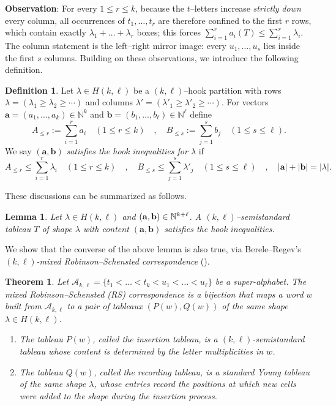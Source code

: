 \documentclass[12pt,a4paper,oneside]{amsart}
\newtheorem{theorem}{Theorem}[section]
\newtheorem{lemma}{Lemma}[section]
\theoremstyle{definition}
\newtheorem{definition}{Definition}[section]
\newcommand{\N}{\mathbb{N}}
\begin{document}
\textbf{Observation}: For every $1\le r\le k$, because the $t$–letters increase \emph{strictly} \textit{down} every column, all occurrences of $t_1,\dots ,t_r$ are therefore confined to the first $r$ rows, which contain exactly $\lambda_1+\dots +\lambda_r$ boxes; this forces $\sum_{i=1}^r a_i(T)\le \sum_{i=1}^{r}\lambda_i$. The column statement is the left–right mirror image: every $u_1,\dots ,u_s$ lies inside the first $s$ columns. Building on these observations, we introduce the following definition.

\begin{definition}
Let $\lambda\in H(k,\ell)$ be a $(k,\ell)$–hook partition with rows $\lambda=(\lambda_1\ge\lambda_2\ge\cdots)$ and columns $\lambda'=(\lambda'_1\ge\lambda'_2\ge\cdots)$.
For vectors $\mathbf a=(a_1,\dots ,a_k)\in\N^{k}$
and $\mathbf b=(b_1,\dots ,b_\ell)\in\N^{\ell}$ define
\[
  A_{\le r}:=\sum_{i=1}^{r}a_i \quad(1\le r\le k) \quad ,
  \quad
  B_{\le s}:=\sum_{j=1}^{s}b_j \quad(1\le s\le\ell).
\]
We say $(\mathbf a,\mathbf b)$ \emph{satisfies the hook inequalities for $\lambda$} if
\[
  A_{\le r}\le\sum_{i=1}^{r}\lambda_i \quad(1\le r\le k)\quad ,\quad
  B_{\le s}\le\sum_{j=1}^{s}\lambda'_j \quad(1\le s\le\ell)\quad ,\quad
  |\mathbf a|+|\mathbf b|=|\lambda|.
\]
\end{definition}

These discussions can be summarized as follows. 

\begin{lemma}
Let $\lambda\in H(k,\ell)$ and $(\mathbf a,\mathbf b)\in\Bbb N^{k+\ell}$. A $(k,\ell)$–semistandard tableau $T$ of shape $\lambda$ with content $(\mathbf a,\mathbf b)$ satisfies the hook inequalities.
\end{lemma}

We show that the converse of the above lemma is also true, via Berele–Regev’s \emph{$(k,\ell)$-mixed Robinson–Schensted correspondence} (\cite[2.5--2.7]{BR87}).

\begin{theorem}\label{thm:BR-RS}
Let $\mathcal{A}_{k,\ell} = \{t_1 < \dots < t_k < u_1 < \dots < u_\ell\}$ be a super-alphabet. The mixed Robinson--Schensted (RS) correspondence is a bijection that maps a word $w$ built from $\mathcal{A}_{k,\ell}$ to a pair of tableaux $(P(w), Q(w))$ of the same shape $\lambda \in H(k,\ell)$.
\begin{enumerate}
    \item The tableau $P(w)$, called the \emph{insertion tableau}, is a $(k,\ell)$-semistandard tableau whose content is determined by the letter multiplicities in $w$.
    \item The tableau $Q(w)$, called the \emph{recording tableau}, is a standard Young tableau of the same shape $\lambda$, whose entries record the positions at which new cells were added to the shape during the insertion process.
\end{enumerate}
\end{theorem}
\end{document}
